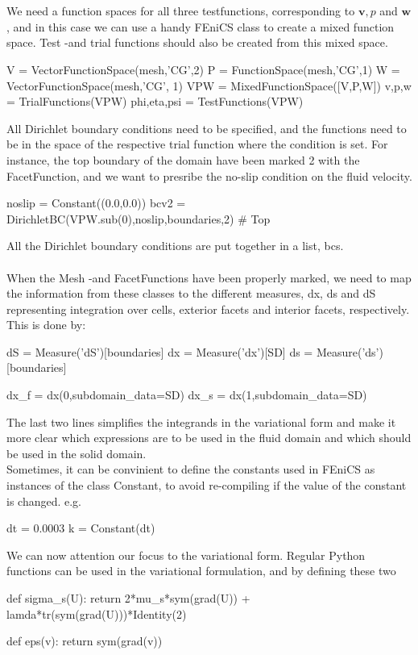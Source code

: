 \\ \\	
We need a function spaces for all three testfunctions, corresponding to $\mathbf{v}, p$ and $\mathbf{w}$, and in this case we can use a handy FEniCS class to create a mixed function space. Test -and trial functions should also be created from this mixed space.
\begin{cverbatim}
V = VectorFunctionSpace(mesh,'CG',2)
P = FunctionSpace(mesh,'CG',1)
W = VectorFunctionSpace(mesh,'CG', 1)
VPW = MixedFunctionSpace([V,P,W])
v,p,w = TrialFunctions(VPW)
phi,eta,psi = TestFunctions(VPW)
\end{cverbatim}
All Dirichlet boundary conditions need to be specified, and the functions need to be in the space of the respective trial function where the condition is set. For instance, the top boundary of the domain have been marked 2 with the FacetFunction, and we want to presribe the no-slip condition on the fluid velocity.
\begin{cverbatim}
noslip = Constant((0.0,0.0))
bcv2 = DirichletBC(VPW.sub(0),noslip,boundaries,2) # Top
\end{cverbatim}
All the Dirichlet boundary conditions are put together in a list, bcs.\\ \\
When the Mesh -and FacetFunctions have been properly marked, we need to map the information from these classes to the different measures, dx, ds and dS representing integration over cells, exterior facets and interior facets, respectively. This is done by:
\begin{cverbatim}
dS = Measure('dS')[boundaries]
dx = Measure('dx')[SD]
ds = Measure('ds')[boundaries]

dx_f = dx(0,subdomain_data=SD)
dx_s = dx(1,subdomain_data=SD)
\end{cverbatim}
The last two lines simplifies the integrands in the variational form and make it more clear which expressions are to be used in the fluid domain and which should be used in the solid domain.
\\
Sometimes, it can be convinient to define the constants used in FEniCS as instances of the class Constant, to avoid re-compiling if the value of the constant is changed. e.g.
\begin{cverbatim}
dt = 0.0003
k = Constant(dt)
\end{cverbatim}
We can now attention our focus to the variational form. Regular Python functions can be used in the variational formulation, and by defining these two
\begin{cverbatim}
def sigma_s(U):
	return 2*mu_s*sym(grad(U)) + lamda*tr(sym(grad(U)))*Identity(2)

def eps(v):
	return sym(grad(v))
\end{cverbatim}
